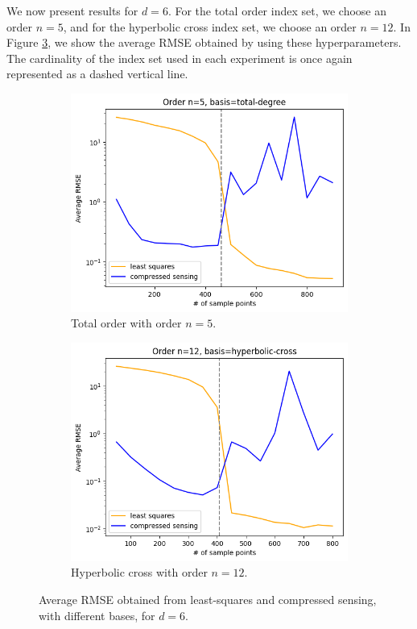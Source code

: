\documentclass[12pt, oneside]{report}   	%
\begin{document}
We now present results for $d=6$. For the total order index set, we choose an order $n=5$, and for the hyperbolic cross index set, we choose an order $n=12$. In Figure \ref{fig:convd6}, we show the average RMSE obtained by using these hyperparameters. The cardinality of the index set used in each experiment is once again represented as a dashed vertical line.
\begin{figure}[t]
     \centering
     \begin{subfigure}[b]{0.45\textwidth}
         \centering
         \includegraphics[width=\textwidth]{img/GGd6TD5.png}
         \caption{Total order with order $n=5$.}
         \label{fig:convd6TD}
     \end{subfigure}
     \hfill
     \begin{subfigure}[b]{0.45\textwidth}
         \centering
         \includegraphics[width=\textwidth]{img/GGd6HC12.png}
         \caption{Hyperbolic cross with order $n=12$.}
         \label{fig:convd6HC}
     \end{subfigure}
        \caption{Average RMSE obtained from least-squares and compressed sensing, with different bases, for $d=6$.}
        \label{fig:convd6}
\end{figure}
\end{document}
